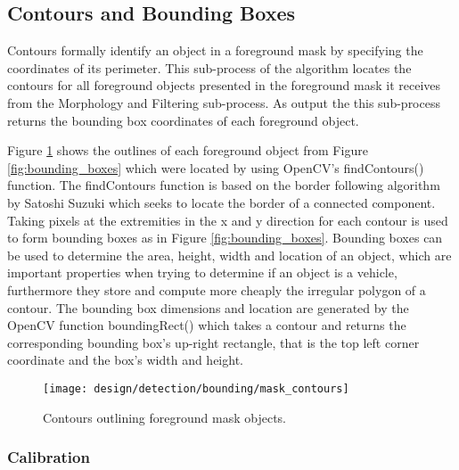 
\subsection{Contours and Bounding Boxes}

Contours formally identify an object in a foreground mask by specifying the coordinates of its perimeter. This sub-process of the algorithm locates the contours for all foreground objects presented in the foreground mask it receives from the Morphology and Filtering sub-process. As output the this sub-process returns the bounding box coordinates of each foreground object. 

Figure \ref{fig:contour_polygon} shows the outlines of each foreground object from Figure \ref{fig:bounding_boxes} which were located by using OpenCV's findContours() function. The findContours function is based on the border following algorithm by Satoshi Suzuki \cite{satoshi_findContours} which seeks to locate the border of a connected component. Taking pixels at the extremities in the x and y direction for each contour is used to form bounding boxes as in Figure \ref{fig:bounding_boxes}. Bounding boxes can be used to determine the area, height, width and location of an object, which are important properties when trying to determine if an object is a vehicle, furthermore they store and compute more cheaply the irregular polygon of a contour. The bounding box dimensions and location are generated by the OpenCV function boundingRect() which takes a contour and returns the corresponding bounding box's up-right rectangle, that is the top left corner coordinate and the box's width and height. 


\begin{figure}[H]
    \centering
    \centering\texttt{[image: design/detection/bounding/mask\_contours]}
    \caption{Contours outlining foreground mask objects.}
    \label{fig:contour_polygon}
\end{figure}

\subsubsection{Calibration}

